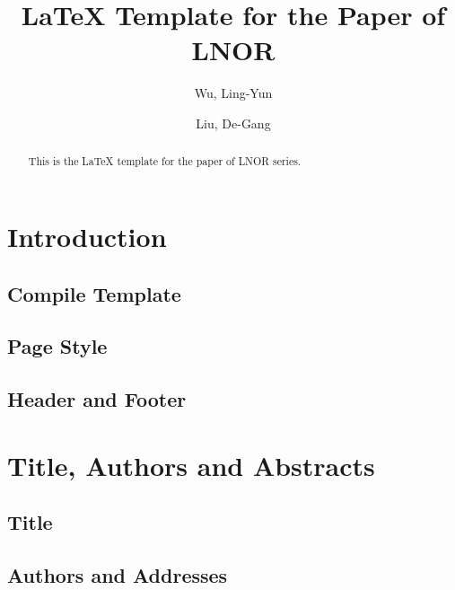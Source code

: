 \documentclass{LNOR}
\begin{document}


\title{LaTeX Template for the Paper of LNOR}{}

\author[1]{Wu, Ling-Yun}{}
\author[1,2]{Liu, De-Gang}{}

\address[1]{Institute of Applied Mathematics\\ Academy of Mathematics and Systems Science, CAS, Beijing 100190}
\address[2]{Operations Research Society of China, Beijing 100190}

\maketitle

\begin{abstract}
This is the LaTeX template for the paper of LNOR series.

\end{abstract}




\section{Introduction}


\subsection{Compile Template}

\subsection{Page Style}

\subsection{Header and Footer}


\section{Title, Authors and Abstracts}

\subsection{Title}

\subsection{Authors and Addresses}
\end{document}
